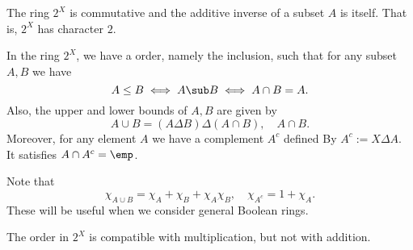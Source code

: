 \begin{proposition}
The ring $2^X$ is commutative and the additive inverse of a subset $A$ is itself. That is, $2^X$ has character $2$. 
\end{proposition}
\begin{proposition}
In the ring $2^X$, we have a order, namely the inclusion, such that for any subset $A,B$ we have
\[A\leq B\iff A\sub B\iff A\cap B=A.\]
Also, the upper and lower bounds of $A,B$ are given by
\[A\cup B=(A\Delta B)\Delta(A\cap B),\quad A\cap B.\]
Moreover, for any element $A$ we have a complement $A^c$ defined By $A^c:=X\Delta A$. It satisfies $A\cap A^c=\emp$.
\end{proposition}
\begin{remark}
Note that
\[\chi_{A\cup B}=\chi_A+\chi_B+\chi_A\chi_B,\quad \chi_{A^c}=1+\chi_A.\]
These will be useful when we consider general Boolean rings.
\end{remark}
\begin{remark}
The order in $2^X$ is compatible with multiplication, but not with addition.
\end{remark}
